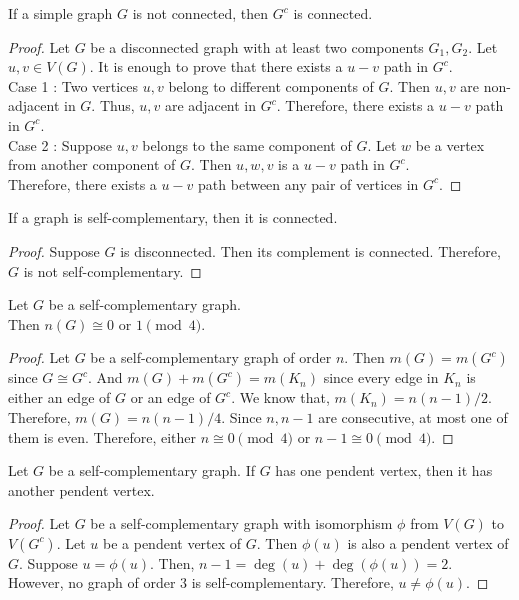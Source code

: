 \begin{theorem}
	If a simple graph $G$ is not connected, then $G^c$ is connected.
\end{theorem}
\begin{proof}
	Let $G$ be a disconnected graph with at least two components $G_1,G_2$.
	Let $u,v \in V(G)$. It is enough to prove that there exists a $u-v$ path in $G^c$.\\

	Case 1 : Two vertices $u,v$ belong to different components of $G$.
	Then $u,v$ are non-adjacent in $G$. Thus, $u,v$ are adjacent in $G^c$. Therefore, there exists a $u-v$ path in $G^c$.\\

	Case 2 : Suppose $u,v$ belongs to the same component of $G$. Let $w$ be a vertex from another component of $G$. Then $u,w,v$ is a $u-v$ path in $G^c$.\\

	Therefore, there exists a $u-v$ path between any pair of vertices in $G^c$.
\end{proof}

\begin{corollary}
	If a graph is self-complementary, then it is connected.
\end{corollary}
\begin{proof}
	Suppose $G$ is disconnected. Then its complement is connected. Therefore, $G$ is not self-complementary.
\end{proof}

\begin{exercise}
	Let $G$ be a self-complementary graph.\\ Then $n(G) \cong 0 \text{ or } 1 \pmod{4}$.
\end{exercise}
\begin{proof}
	Let $G$ be a self-complementary graph of order $n$.
	Then $m(G) = m(G^c)$ since $G \cong G^c$.
	And $m(G)+m(G^c)= m(K_n)$ since every edge in $K_n$ is either an edge of $G$ or an edge of $G^c$.
	We know that, $m(K_n) = n(n-1)/2$.
	Therefore, $m(G) = n(n-1)/4$.
	Since $n,n-1$ are consecutive, at most one of them is even.
	Therefore, either $n \cong 0 \pmod{4}$ or $n-1 \cong 0 \pmod{4}$.
\end{proof}

\begin{exercise}
	Let $G$ be a self-complementary graph.
	If $G$ has one pendent vertex, then it has another pendent vertex.
\end{exercise}
\begin{proof}
	Let $G$ be a self-complementary graph with isomorphism $\phi$ from $V(G)$ to $V(G^c)$.
	Let $u$ be a pendent vertex of $G$.
	Then $\phi(u)$ is also a pendent vertex of $G$.
	Suppose $u = \phi(u)$. Then, $n-1 = \deg(u) + \deg(\phi(u)) = 2$. However, no graph of order $3$ is self-complementary.
	Therefore, $u \ne \phi(u)$.
\end{proof}

